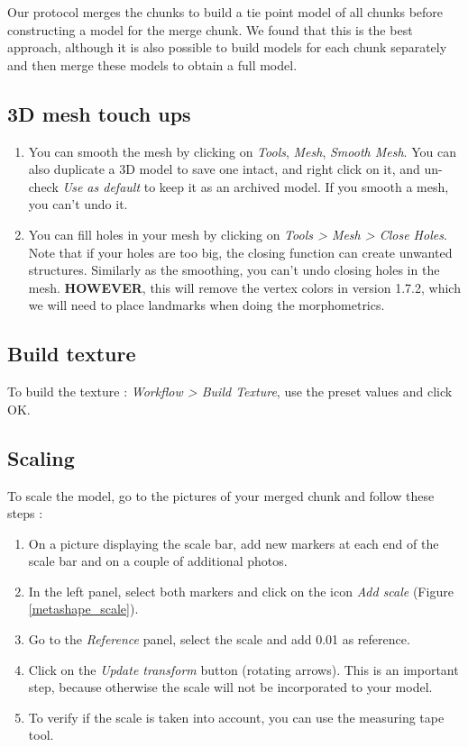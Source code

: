 \documentclass[10pt,letter,english]{article}
\begin{document}
\begin{tcolorbox}[width=\linewidth, colback=mygray,title=Note on 3D mesh construction,colframe=lightgray]
Our protocol merges the chunks to build a tie point model of all chunks before constructing a model for the merge chunk. We found that this is the best approach, although it is also possible to build models for each chunk separately and then merge these models to obtain a full model.
\end{tcolorbox}



\subsection{3D mesh touch ups}
\begin{enumerate}
    \item You can smooth the mesh by clicking on \textit{Tools}, \textit{Mesh}, \textit{Smooth Mesh}. You can also duplicate a 3D model to save one intact, and right click on it, and un-check \textit{Use as default} to keep it as an archived model. If you smooth a mesh, you can't undo it.
    \item You can fill holes in your mesh by clicking on \textit{Tools > Mesh > Close Holes}. Note that if your holes are too big, the closing function can create unwanted structures. Similarly as the smoothing, you can't undo closing holes in the mesh. \textbf{HOWEVER}, this will remove the vertex colors in version 1.7.2, which we will need to place landmarks when doing the morphometrics.
\end{enumerate}


\subsection{Build texture}

To build the texture : \textit{Workflow > Build Texture}, use the preset values and click OK.



\subsection{Scaling}
\noindent To scale the model, go to the pictures of your merged chunk and follow these steps :
    \begin{enumerate}
        \item On a picture displaying the scale bar, add new markers at each end of the scale bar and on a couple of additional photos.
        \item In the left panel, select both markers and click on the icon \textit{Add scale} (Figure \ref{metashape_scale}). %
        \item Go to the \textit{Reference} panel, select the scale and add 0.01 as reference.
        \item Click on the \textit{Update transform} button (rotating arrows). This is an important step, because otherwise the scale will not be incorporated to your model.
        \item To verify if the scale is taken into account, you can use the measuring tape tool.
    \end{enumerate}
\end{document}
